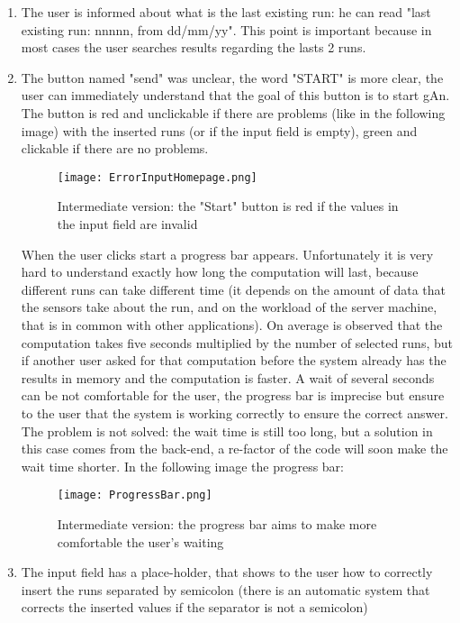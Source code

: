 \begin{enumerate}

\item The user is informed about what is the last existing run: he can read "last existing run: nnnnn, from dd/mm/yy". This point is important because in most cases the user searches results regarding the lasts 2 runs.

\item The button named "send" was unclear, the word "START" is more clear, the user can immediately understand that the goal of this button is to start gAn. The button is red and unclickable if there are problems (like in the following image) with the inserted runs (or if the input field is empty), green and clickable if there are no problems.	

\begin{figure}[H]
\centering
\texttt{[image: ErrorInputHomepage.png]}  
\caption{Intermediate version: the "Start" button is red if the values in the input field are invalid}
\end{figure}

When the user clicks start a progress bar appears. Unfortunately it is very hard to understand exactly how long the computation will last, because different runs can take different time (it depends on the amount of data that the sensors take about the run, and on the workload of the server machine, that is in common with other applications). On average is observed that the computation takes five seconds multiplied by the number of selected runs, but if another user asked for that computation before the system already has the results in memory and the computation is faster. A wait of several seconds can be not comfortable for the user, the progress bar is imprecise but ensure to the user that the system is working correctly to ensure the correct answer. The problem is not solved: the wait time is still too long, but a solution in this case comes from the back-end, a re-factor of the code will soon make the wait time shorter. In the following image the progress bar:

\begin{figure}[H]
\centering
\texttt{[image: ProgressBar.png]}  
\caption{Intermediate version: the progress bar aims to make more comfortable the user's waiting}
\end{figure}



\item The input field has a place-holder, that shows to the user how to correctly insert the runs separated by semicolon (there is an automatic system that corrects the inserted values if the separator is not a semicolon)
 

\end{enumerate}
